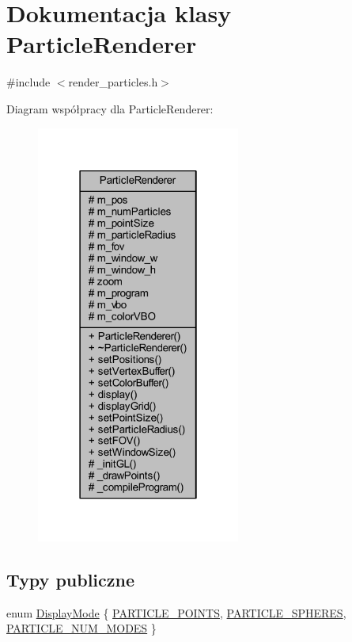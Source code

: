 \hypertarget{class_particle_renderer}{\section{Dokumentacja klasy Particle\-Renderer}
\label{class_particle_renderer}
}


{\ttfamily \#include $<$render\-\_\-particles.\-h$>$}



Diagram współpracy dla Particle\-Renderer\-:\nopagebreak
\begin{figure}[H]
\begin{center}
\leavevmode
\includegraphics[width=190pt]{class_particle_renderer__coll__graph}
\end{center}
\end{figure}
\subsection*{Typy publiczne}
\begin{DoxyCompactItemize}
\item 
enum \hyperlink{class_particle_renderer_a7b691afffd1abe415cb0ce17fd26f3d5}{Display\-Mode} \{ \hyperlink{class_particle_renderer_a7b691afffd1abe415cb0ce17fd26f3d5a76d84afc3ec5c09bff035fe798dacbbe}{P\-A\-R\-T\-I\-C\-L\-E\-\_\-\-P\-O\-I\-N\-T\-S}, 
\hyperlink{class_particle_renderer_a7b691afffd1abe415cb0ce17fd26f3d5acc641adfb37c1a267e9f91d128094111}{P\-A\-R\-T\-I\-C\-L\-E\-\_\-\-S\-P\-H\-E\-R\-E\-S}, 
\hyperlink{class_particle_renderer_a7b691afffd1abe415cb0ce17fd26f3d5a251fd7044eb27c60bf1eaa1e64a2d2dc}{P\-A\-R\-T\-I\-C\-L\-E\-\_\-\-N\-U\-M\-\_\-\-M\-O\-D\-E\-S}
 \}
\end{DoxyCompactItemize}
